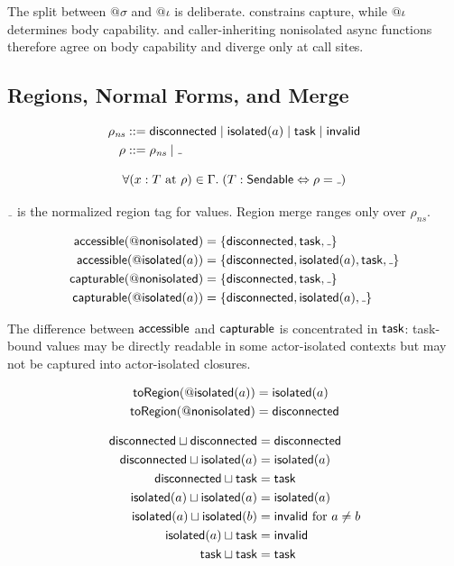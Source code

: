 The split between $@\sigma$ and $@\iota$ is deliberate.  constrains capture, while $@\iota$ determines body capability.  and caller-inheriting nonisolated async functions therefore agree on body capability and diverge only at call sites.

\subsection{Regions, Normal Forms, and Merge}

\[
\begin{aligned}
  \rho_{\mathit{ns}} &::= \disconnected \mid \isolated(a) \mid \task \mid \invalid \\
  \rho &::= \rho_{\mathit{ns}} \mid \mathunderscore
\end{aligned}
\]

\[
  \forall (x : T \at \rho) \in \Gamma.\; (T : \textsf{Sendable} \Leftrightarrow \rho = \mathunderscore)
\]

$\mathunderscore$ is the normalized region tag for  values. Region merge ranges only over $\rho_{\mathit{ns}}$.

\[
\begin{aligned}
  \Accessible(@\textsf{nonisolated}) &= \{\disconnected, \task, \mathunderscore\} \\
  \Accessible(@\isolated(a)) &= \{\disconnected, \isolated(a), \task, \mathunderscore\} \\
  \Capturable(@\textsf{nonisolated}) &= \{\disconnected, \task, \mathunderscore\} \\
  \Capturable(@\isolated(a)) &= \{\disconnected, \isolated(a), \mathunderscore\}
\end{aligned}
\]

The difference between $\textsf{accessible}$ and $\textsf{capturable}$ is concentrated in $\textsf{task}$: task-bound values may be directly readable in some actor-isolated contexts but may not be captured into actor-isolated closures.

\[
\begin{aligned}
  \textsf{toRegion}(@\textsf{isolated}(a)) &= \textsf{isolated}(a) \\
  \textsf{toRegion}(@\textsf{nonisolated}) &= \textsf{disconnected}
\end{aligned}
\]

\[
\begin{aligned}
  \textsf{disconnected} \sqcup \textsf{disconnected} &= \textsf{disconnected} \\
  \textsf{disconnected} \sqcup \textsf{isolated}(a) &= \textsf{isolated}(a) \\
  \textsf{disconnected} \sqcup \textsf{task} &= \textsf{task} \\
  \textsf{isolated}(a) \sqcup \textsf{isolated}(a) &= \textsf{isolated}(a) \\
  \textsf{isolated}(a) \sqcup \textsf{isolated}(b) &= \textsf{invalid} \text{ for } a \neq b \\
  \textsf{isolated}(a) \sqcup \textsf{task} &= \textsf{invalid} \\
  \textsf{task} \sqcup \textsf{task} &= \textsf{task}
\end{aligned}
\]

